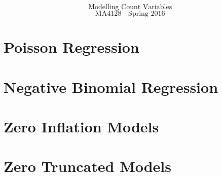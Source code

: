 \documentclass{beamer}
\begin{document}
\begin{frame}
	\huge
	\[ \mbox{Modelling Count Variables } \]
	\Large
	\[ \mbox{MA4128 - Spring 2016  } \]
	\end{frame}





\section{Poisson Regression}


%

% 

\section{Negative Binomial Regression}



\section{Zero Inflation Models}

% 


% 
\section{Zero Truncated Models}




%
\end{document}
